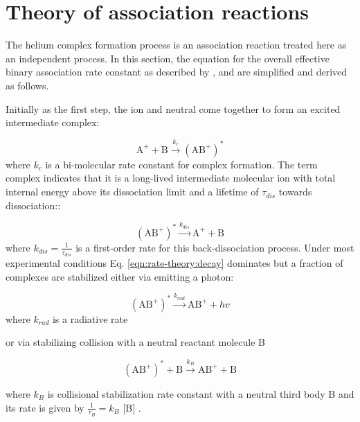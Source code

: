 \section{Theory of association reactions}
\label{subsec:rate-theory}

The helium complex formation process is an association reaction treated here as an independent  process. In this section, the equation for the overall effective binary association rate constant as described by \citet{gerlich_experimental_1992}, and \citet{bates_radiative_1988}  are simplified and derived as follows.

Initially as the first step, the ion and neutral come together to form an excited intermediate complex: 

\begin{equation}
    \text{A}^+ + \text{B} \xrightarrow{k_c} (\text{AB}^+) ^*
\end{equation}
where $k_c$ is a bi-molecular rate constant for complex formation. The term complex indicates that it is a long-lived intermediate molecular ion with total internal energy above its dissociation limit and a lifetime of $\tau_{dis}$  towards dissociation::

\begin{equation}
    (\text{AB}^+) ^* \xrightarrow{k_{dis}} \text{A}^+ + \text{B}
    \label{eqn:rate-theory:decay}
\end{equation}
where $k_{dis} = \frac{1}{\tau_{dis}}$ is a first-order rate for this back-dissociation process. Under most experimental conditions Eq. \ref{eqn:rate-theory:decay} dominates but a fraction of complexes are stabilized either via emitting a photon:

\begin{equation}
    (\text{AB}^+) ^* \xrightarrow{k_{rad}} \text{AB}^+ + hv
    \label{eqn:rate-theory:via-hv}
\end{equation}
where $k_{rad}$ is a radiative rate

or via stabilizing collision with a neutral reactant molecule B

\begin{equation}
    (\text{AB}^+) ^* + \text{B}\xrightarrow{k_{B}} \text{AB}^+ + \text{B}
    \label{eqn:rate-theory:via-He}
\end{equation}

where $k_{B}$ is collisional stabilization rate constant with a neutral third body B and its rate is given by $\frac{1}{\tau_B} = k_{B}$ [B] .

